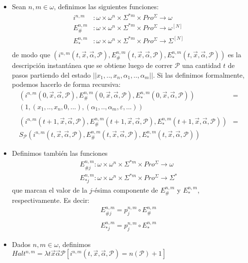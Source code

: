 \documentclass[
]{article}
\providecommand{\tightlist}{%
  \setlength{\itemsep}{0pt}\setlength{\parskip}{0pt}}
\begin{document}
\begin{itemize}
\tightlist
\item
  Sean \(n,m\in\omega\), definimos las siguientes funciones:
  \[\begin{aligned} i^{n,m} &: \omega\times\omega^n\times\Sigma^{*m}\times Pro^\Sigma\to\omega\\ E^{n,m}_\# &: \omega\times\omega^n\times\Sigma^{*m}\times Pro^\Sigma\to\omega^{[N]}\\ E^{n,m}_* &: \omega\times\omega^n\times\Sigma^{*m}\times Pro^\Sigma\to\Sigma^{[N]}\\ \end{aligned}\]
  de modo que
  \((i^{n,m}(t, \vec{x}, \vec{\alpha}, \mathcal{P}), E^{n,m}_\#(t, \vec{x}, \vec{\alpha}, \mathcal{P}), E^{n,m}_*(t, \vec{x}, \vec{\alpha}, \mathcal{P}))\)
  es la descripción instantánea que se obtiene luego de correr
  \(\mathcal{P}\) una cantidad \(t\) de pasos partiendo del estado
  \(||x_1, .., x_n, \alpha_1, .., \alpha_m||\). Si las definimos
  formalmente, podemos hacerlo de forma recursiva:
  \[\begin{aligned} (i^{n,m}(0, \vec{x}, \vec{\alpha}, \mathcal{P}), E^{n,m}_\#(0, \vec{x}, \vec{\alpha}, \mathcal{P}), E^{n,m}_*(0, \vec{x}, \vec{\alpha}, \mathcal{P})) &= \\(1,(x_1, .., x_n,0,...),(\alpha_1, .., \alpha_m,\varepsilon,...))\\ \\ (i^{n,m}(t+1, \vec{x}, \vec{\alpha}, \mathcal{P}), E^{n,m}_\#(t+1, \vec{x}, \vec{\alpha}, \mathcal{P}), E^{n,m}_*(t+1, \vec{x}, \vec{\alpha}, \mathcal{P})) &= \\ S_\mathcal{P}(i^{n,m}(t, \vec{x}, \vec{\alpha}, \mathcal{P}), E^{n,m}_\#(t, \vec{x}, \vec{\alpha}, \mathcal{P}), E^{n,m}_*(t, \vec{x}, \vec{\alpha}, \mathcal{P}))\end{aligned}\]
\item
  Definimos también las funciones
  \[\begin{aligned} E^{n,m}_{\#j}: \omega\times\omega^n\times\Sigma^{*m}\times Pro^\Sigma\to\omega\\ E^{n,m}_{*j}:\omega\times\omega^n\times\Sigma^{*m}\times Pro^\Sigma\to\Sigma^*\end{aligned}\]
  que marcan el valor de la \(j\)-ésima componente de \(E^{n,m}_\#\) y
  \(E^{n,m}_*\), respectivamente. Es decir:
  \[\begin{aligned}E^{n,m}_{\#j} = p^{n,m}_j\circ E^{n,m}_\#\\ \\ E^{n,m}_{*j} = p^{n,m}_j\circ E^{n,m}_*\end{aligned}\]
\item
  Dados \(n,m\in\omega\), definimos
  \(Halt^{n,m}=\lambda t\vec{x}\vec{\alpha}\mathcal{P} [i^{n,m}(t, \vec{x}, \vec{\alpha}, \mathcal{P}) = n(\mathcal{P}) + 1]\)


\end{itemize}
\end{document}
